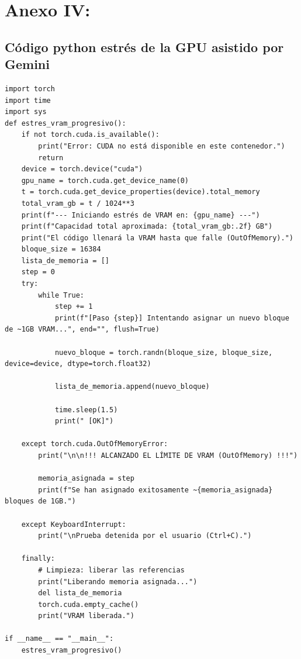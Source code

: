 \section{Anexo IV: }
\subsection{Código python estrés de la GPU asistido por Gemini}
\begin{lstlisting}[language=python-custom, caption={Script de estrés progresivo de VRAM mediante PyTorch}, label={lst:stress_vram_python}]
import torch
import time
import sys
def estres_vram_progresivo():
    if not torch.cuda.is_available():
        print("Error: CUDA no está disponible en este contenedor.")
        return
    device = torch.device("cuda")
    gpu_name = torch.cuda.get_device_name(0)
    t = torch.cuda.get_device_properties(device).total_memory
    total_vram_gb = t / 1024**3
    print(f"--- Iniciando estrés de VRAM en: {gpu_name} ---")
    print(f"Capacidad total aproximada: {total_vram_gb:.2f} GB")
    print("El código llenará la VRAM hasta que falle (OutOfMemory).")
    bloque_size = 16384 
    lista_de_memoria = []
    step = 0
    try:
        while True:
            step += 1
            print(f"[Paso {step}] Intentando asignar un nuevo bloque de ~1GB VRAM...", end="", flush=True)
            
            nuevo_bloque = torch.randn(bloque_size, bloque_size, device=device, dtype=torch.float32)
            
            lista_de_memoria.append(nuevo_bloque)
            
            time.sleep(1.5) 
            print(" [OK]")

    except torch.cuda.OutOfMemoryError:
        print("\n\n!!! ALCANZADO EL LÍMITE DE VRAM (OutOfMemory) !!!")
        
        memoria_asignada = step 
        print(f"Se han asignado exitosamente ~{memoria_asignada} bloques de 1GB.")
        
    except KeyboardInterrupt:
        print("\nPrueba detenida por el usuario (Ctrl+C).")
        
    finally:
        # Limpieza: liberar las referencias
        print("Liberando memoria asignada...")
        del lista_de_memoria
        torch.cuda.empty_cache()
        print("VRAM liberada.")

if __name__ == "__main__":
    estres_vram_progresivo()
\end{lstlisting}
